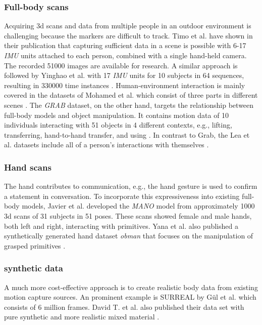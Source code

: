 \subsubsection{Full-body scans}
Acquiring 3d scans and data from multiple people in an outdoor environment is challenging because the markers are difficult to track. Timo et al. have shown in their publication that capturing sufficient data in a scene is possible with 6-17 \emph{IMU} units attached to each person, combined with a single hand-held camera. The recorded 51000 images are available for research.\cite{vip} A similar approach is followed by Yinghao et al. with 17 \emph{IMU} units for 10 subjects in 64 sequences, resulting in 330000 time instances \cite{dip}. Human-environment interaction is mainly covered in the datasets of Mohamed et al. which consist of three parts in different scenes \cite{prox}. The \emph{GRAB} dataset, on the other hand, targets the relationship between full-body models and object manipulation. It contains motion data of 10 individuals interacting with 51 objects in 4 different contexts, e.g., lifting, transferring, hand-to-hand transfer, and using \cite{grab}. In contrast to Grab, the Lea et al. datasets include all of a person's interactions with themselves \cite{tuch}.

\subsubsection{Hand scans}
The hand contributes to communication, e.g., the hand gesture is used to confirm a statement in conversation. To incorporate this expressiveness into existing full-body models, Javier et al. developed the \emph{MANO} model from approximately 1000 3d scans of 31 subjects in 51 poses. These scans showed female and male hands, both left and right, interacting with primitives. \cite{mano} 
Yana et al. also published a synthetically generated hand dataset \emph{obman} that focuses on the manipulation of grasped primitives \cite{obman}.

\subsubsection{synthetic data}
A much more cost-effective approach is to create realistic body data from existing motion capture sources. An prominent example is SURREAL by Gül et al. which consists of 6 million frames\cite{surreal}. David T. et al. also published their data set with pure synthetic and more realistic mixed material \cite{ltsh}.


